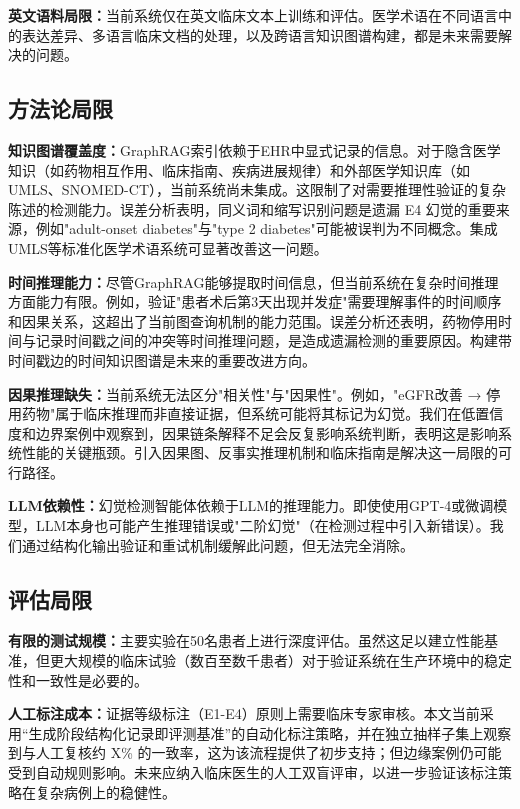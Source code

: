 \documentclass[11pt]{article}
\begin{document}
\textbf{英文语料局限：}当前系统仅在英文临床文本上训练和评估。医学术语在不同语言中的表达差异、多语言临床文档的处理，以及跨语言知识图谱构建，都是未来需要解决的问题。

\subsection{方法论局限}

\textbf{知识图谱覆盖度：}GraphRAG索引依赖于EHR中显式记录的信息。对于隐含医学知识（如药物相互作用、临床指南、疾病进展规律）和外部医学知识库（如UMLS、SNOMED-CT），当前系统尚未集成。这限制了对需要推理性验证的复杂陈述的检测能力。误差分析表明，同义词和缩写识别问题是遗漏 E4 幻觉的重要来源，例如"adult-onset diabetes"与"type 2 diabetes"可能被误判为不同概念。集成UMLS等标准化医学术语系统可显著改善这一问题。

\textbf{时间推理能力：}尽管GraphRAG能够提取时间信息，但当前系统在复杂时间推理方面能力有限。例如，验证"患者术后第3天出现并发症"需要理解事件的时间顺序和因果关系，这超出了当前图查询机制的能力范围。误差分析还表明，药物停用时间与记录时间戳之间的冲突等时间推理问题，是造成遗漏检测的重要原因。构建带时间戳边的时间知识图谱是未来的重要改进方向。

\textbf{因果推理缺失：}当前系统无法区分"相关性"与"因果性"。例如，"eGFR改善 → 停用药物"属于临床推理而非直接证据，但系统可能将其标记为幻觉。我们在低置信度和边界案例中观察到，因果链条解释不足会反复影响系统判断，表明这是影响系统性能的关键瓶颈。引入因果图、反事实推理机制和临床指南是解决这一局限的可行路径。

\textbf{LLM依赖性：}幻觉检测智能体依赖于LLM的推理能力。即使使用GPT-4或微调模型，LLM本身也可能产生推理错误或"二阶幻觉"（在检测过程中引入新错误）。我们通过结构化输出验证和重试机制缓解此问题，但无法完全消除。

\subsection{评估局限}

\textbf{有限的测试规模：}主要实验在50名患者上进行深度评估。虽然这足以建立性能基准，但更大规模的临床试验（数百至数千患者）对于验证系统在生产环境中的稳定性和一致性是必要的。

\textbf{人工标注成本：}证据等级标注（E1-E4）原则上需要临床专家审核。本文当前采用``生成阶段结构化记录即评测基准''的自动化标注策略，并在独立抽样子集上观察到与人工复核约 X\% 的一致率，这为该流程提供了初步支持；但边缘案例仍可能受到自动规则影响。未来应纳入临床医生的人工双盲评审，以进一步验证该标注策略在复杂病例上的稳健性。
\end{document}
